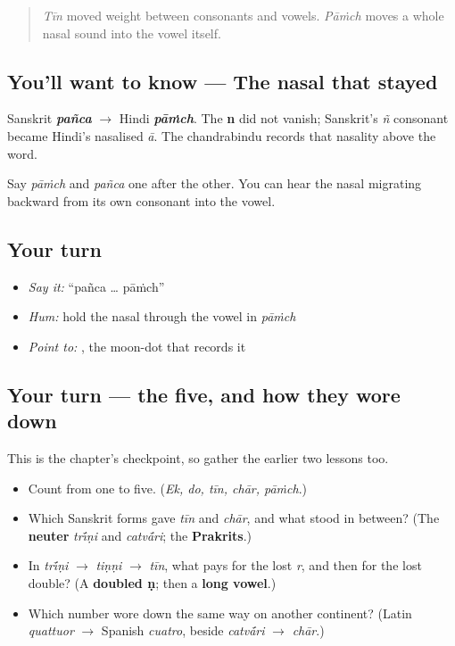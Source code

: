\label{lesson:HI-C06-paanch-nasal}



\begin{quote}
\emph{Tīn} moved weight between consonants and vowels. \emph{Pāṁch} moves a whole nasal sound into the vowel itself.
\end{quote}

\subsection*{You'll want to know — The nasal that stayed}
Sanskrit \emph{\textbf{pañca}} $\to$ Hindi \emph{\textbf{pāṁch}}. The \textbf{n} did not vanish; Sanskrit's \emph{ñ} consonant became Hindi's nasalised \emph{ā}. The \textbf{} chandrabindu records that nasality above the word.

Say \emph{pāṁch} and \emph{pañca} one after the other. You can hear the nasal migrating backward from its own consonant into the vowel.

\subsection*{Your turn}
\begin{itemize}
\raggedright
  \item \emph{Say it:} \textquotedblleft{}pañca … pāṁch\textquotedblright{}
  \item \emph{Hum:} hold the nasal through the vowel in \emph{pāṁch}
  \item \emph{Point to:} \textbf{}, the moon-dot that records it
\end{itemize}

\subsection*{Your turn — the five, and how they wore down}
This is the chapter's checkpoint, so gather the earlier two lessons too.

\begin{itemize}
\raggedright
  \item Count from one to five. (\emph{Ek, do, tīn, chār, pāṁch}.)
  \item Which Sanskrit forms gave \emph{tīn} and \emph{chār}, and what stood in between? (The \textbf{neuter} \emph{tr\'{\={\i}}ṇi} and \emph{catv\'{\={a}}ri}; the \textbf{Prakrits}.)
  \item In \emph{tr\'{\={\i}}ṇi} $\to$ \emph{tiṇṇi} $\to$ \emph{tīn}, what pays for the lost \emph{r}, and then for the lost double? (A \textbf{doubled ṇ}; then a \textbf{long vowel}.)
  \item Which number wore down the same way on another continent? (Latin \emph{quattuor} $\to$ Spanish \emph{cuatro}, beside \emph{catv\'{\={a}}ri} $\to$ \emph{chār}.)
\end{itemize}

